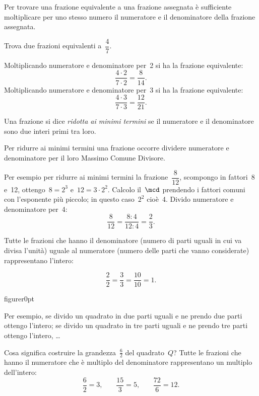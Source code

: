Per trovare una frazione equivalente a una frazione assegnata è sufficiente moltiplicare per uno stesso
numero il numeratore e il denominatore della frazione assegnata.

\begin{exrig}
 \begin{esempio}
 Trova due frazioni equivalenti a~$\dfrac{4}{7}$.

Moltiplicando numeratore e denominatore per~2 si ha la frazione equivalente:
\[\frac{4\cdot2}{7\cdot2}=\frac{8}{14}.\]
Moltiplicando numeratore e denominatore per~3 si ha la frazione equivalente:
\[\frac{4\cdot3}{7\cdot3}=\frac{12}{21}.\]
 \end{esempio}
\end{exrig}

\begin{definizione}
Una frazione si dice \emph{ridotta ai minimi termini} se il numeratore e il denominatore sono due interi primi tra loro.
\end{definizione}

Per ridurre ai minimi termini una frazione occorre dividere numeratore e denominatore per il loro Massimo Comune Divisore.

Per esempio per ridurre ai minimi termini la frazione~$\dfrac{8}{12}$, scompongo in fattori~8 e~12, ottengo~$8=2^3$ e~$12=3\cdot2^2$.
Calcolo il~$\mcd$ prendendo i fattori comuni con l'esponente più piccolo; in questo caso~$2^2$ cioè~4.
Divido numeratore e denominatore per~4:
\[\frac{8}{12} = \frac{8:4}{12:4} = \frac{2}{3}.\]

Tutte le frazioni che hanno il denominatore (numero di parti uguali in cui va divisa l'unità) uguale al numeratore
(numero delle parti che vanno considerate) rappresentano l'intero:

\[\frac{2}{2}=\frac{3}{3}=\frac{10}{10}=1.\]

\begin{wrapfloat}{figure}{r}{0pt}
 
\end{wrapfloat}

Per esempio, se divido un quadrato in due parti uguali e ne prendo due parti ottengo l'intero;
se divido un quadrato in tre parti uguali e ne prendo tre parti ottengo l'intero, \ldots

Cosa significa costruire la grandezza~$\frac{6}{2}$ del quadrato~$Q$?
Tutte le frazioni che hanno il numeratore che è multiplo del denominatore rappresentano un multiplo dell'intero:
\[\frac{6}{2}=3\text{,}\qquad\frac{15}{3}=5\text{,}\qquad\frac{72}{6}=12.\]

